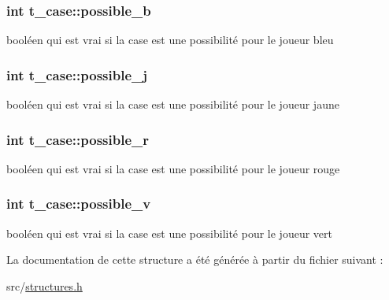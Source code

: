 \subsubsection[{\texorpdfstring{possible\+\_\+b}{possible_b}}]{\setlength{\rightskip}{0pt plus 5cm}int t\+\_\+case\+::possible\+\_\+b}\hypertarget{structt__case_aea7d8d23a697e3cd7b07a44e88f5781b}{}\label{structt__case_aea7d8d23a697e3cd7b07a44e88f5781b}
booléen qui est vrai si la case est une possibilité pour le joueur bleu 
\subsubsection[{\texorpdfstring{possible\+\_\+j}{possible_j}}]{\setlength{\rightskip}{0pt plus 5cm}int t\+\_\+case\+::possible\+\_\+j}\hypertarget{structt__case_a7ba4c0e092015a53344116cc2e54f2dc}{}\label{structt__case_a7ba4c0e092015a53344116cc2e54f2dc}
booléen qui est vrai si la case est une possibilité pour le joueur jaune 
\subsubsection[{\texorpdfstring{possible\+\_\+r}{possible_r}}]{\setlength{\rightskip}{0pt plus 5cm}int t\+\_\+case\+::possible\+\_\+r}\hypertarget{structt__case_abfbade6a8fc1927fbdb8dca9c810b1c4}{}\label{structt__case_abfbade6a8fc1927fbdb8dca9c810b1c4}
booléen qui est vrai si la case est une possibilité pour le joueur rouge 
\subsubsection[{\texorpdfstring{possible\+\_\+v}{possible_v}}]{\setlength{\rightskip}{0pt plus 5cm}int t\+\_\+case\+::possible\+\_\+v}\hypertarget{structt__case_a74e4a7aa37b5071dfc9a4da15d88cc7d}{}\label{structt__case_a74e4a7aa37b5071dfc9a4da15d88cc7d}
booléen qui est vrai si la case est une possibilité pour le joueur vert 

La documentation de cette structure a été générée à partir du fichier suivant \+:\begin{DoxyCompactItemize}
\item 
src/\hyperlink{structures_8h}{structures.\+h}\end{DoxyCompactItemize}
